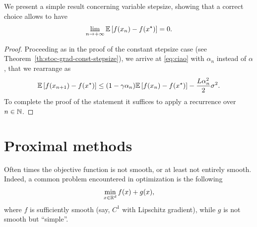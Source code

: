      We present a simple result concerning variable stepsize, showing that a correct choice allows to have
     \begin{equation}
         \lim_{n\to +\infty} \mathbb{E}\left[ f(x_n)-f(x^\star) \right] = 0.
     \end{equation}
 
 
     \begin{proof}
         Proceeding as in the proof of the constant stepsize case (see Theorem~\ref{th:stoc-grad-const-stepsize}), we arrive at \eqref{eq:ciao} with $\alpha_n$ instead of $\alpha$, that we rearrange as
         \begin{equation}
             \mathbb{E}\left[ f(x_{n+1}) -f(x^\star)\right] \le (1-\gamma\alpha_n)  \mathbb{E}\left[f(x_{n}) -f(x^\star)\right]	-\frac{L\alpha_n^2}{2} \sigma^2 .
         \end{equation}
         To complete the proof of the statement it suffices to apply a recurrence over $n\in\mathbb{N}$.
     \end{proof}
 
     \section{Proximal methods}
 
     Often times the objective function is not smooth, or at least not entirely smooth.
     Indeed, a common problem encountered in optimization is the following
     \begin{equation}
         \label{eq:f+g-prox}
         \min_{x\in\mathbb{R}^d} f(x) + g(x),
     \end{equation}
     where $f$ is sufficiently smooth (say, $C^1$ with Lipschitz gradient), while $g$ is not smooth but ``simple''.
 

